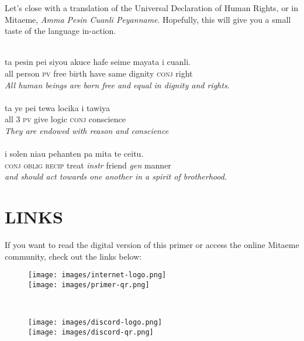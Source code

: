 \documentclass[a4paper]{article}
\begin{document}
Let's close with a translation of the Universal Declaration of Human Rights, or in Mitaeme, \textit{Amma Pesin Cuanli Peyanname}.
Hopefully, this will give you a small taste of the language in-action.\\
\\
\hspace*{1cm}%
\begin{minipage}{.8\textwidth}%
ta pesin pei siyou akuce hafe seime mayata i cuanli.\\
all person \textsc{pv} free birth have same dignity \textsc{conj} right\\
\textit{All human beings are born free and equal in dignity and rights.}\\
\\
ta ye pei tewa locika i tawiya\\
all \textsc{3 pv} give logic \textsc{conj} conscience\\
\textit{They are endowed with reason and conscience}\\
\\
i solen niau pehanten pa mita te ceitu.\\
\textsc{conj oblig recip} treat \textit{instr} friend \textit{gen} manner\\
\textit{and should act towards one another in a spirit of brotherhood.}
\end{minipage}%

\newpage
\section{LINKS}

If you want to read the digital version of this primer or access the online Mitaeme community, check
out the links below:
\\
\begin{figure}[h]
\centering
\texttt{[image: images/internet-logo.png]}
\\
\texttt{[image: images/primer-qr.png]}
\end{figure}
\\
\begin{figure}[h]
\centering
\texttt{[image: images/discord-logo.png]}
\\
\texttt{[image: images/discord-qr.png]}
\end{figure}
\end{document}
